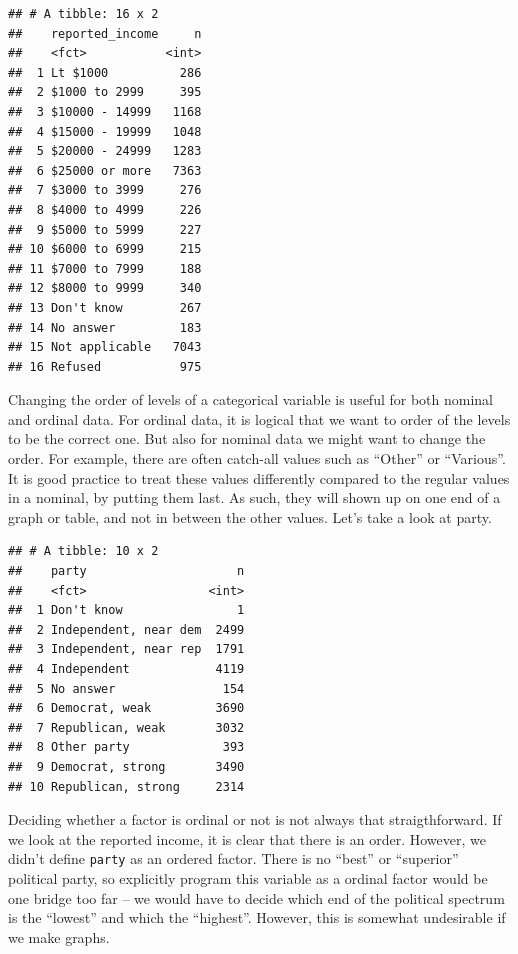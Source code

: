 \documentclass[]{tufte-book}
\newenvironment{Shaded}{}{}
\newcommand{\KeywordTok}[1]{\textcolor[rgb]{0.00,0.44,0.13}{\textbf{#1}}}
\newcommand{\NormalTok}[1]{#1}
\newcommand{\OperatorTok}[1]{\textcolor[rgb]{0.40,0.40,0.40}{#1}}
\newcommand{\StringTok}[1]{\textcolor[rgb]{0.25,0.44,0.63}{#1}}
\begin{document}
\begin{verbatim}
## # A tibble: 16 x 2
##    reported_income     n
##    <fct>           <int>
##  1 Lt $1000          286
##  2 $1000 to 2999     395
##  3 $10000 - 14999   1168
##  4 $15000 - 19999   1048
##  5 $20000 - 24999   1283
##  6 $25000 or more   7363
##  7 $3000 to 3999     276
##  8 $4000 to 4999     226
##  9 $5000 to 5999     227
## 10 $6000 to 6999     215
## 11 $7000 to 7999     188
## 12 $8000 to 9999     340
## 13 Don't know        267
## 14 No answer         183
## 15 Not applicable   7043
## 16 Refused           975
\end{verbatim}

Changing the order of levels of a categorical variable is useful for both nominal and ordinal data. For ordinal data, it is logical that we want to order of the levels to be the correct one. But also for nominal data we might want to change the order. For example, there are often catch-all values such as ``Other'' or ``Various''. It is good practice to treat these values differently compared to the regular values in a nominal, by putting them last. As such, they will shown up on one end of a graph or table, and not in between the other values. Let's take a look at party.

\begin{Shaded}
\end{Shaded}

\begin{verbatim}
## # A tibble: 10 x 2
##    party                     n
##    <fct>                 <int>
##  1 Don't know                1
##  2 Independent, near dem  2499
##  3 Independent, near rep  1791
##  4 Independent            4119
##  5 No answer               154
##  6 Democrat, weak         3690
##  7 Republican, weak       3032
##  8 Other party             393
##  9 Democrat, strong       3490
## 10 Republican, strong     2314
\end{verbatim}

Deciding whether a factor is ordinal or not is not always that straigthforward. If we look at the reported income, it is clear that there is an order. However, we didn't define \texttt{party} as an ordered factor. There is no ``best'' or ``superior'' political party, so explicitly program this variable as a ordinal factor would be one bridge too far -- we would have to decide which end of the political spectrum is the ``lowest'' and which the ``highest''. However, this is somewhat undesirable if we make graphs.
\end{document}

